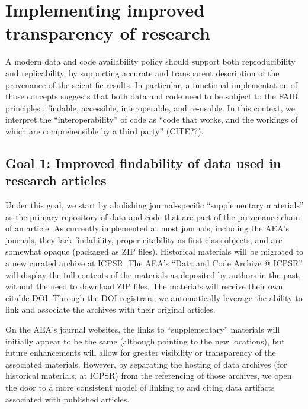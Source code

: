 \documentclass[AEJ]{AEA}
\begin{document}
\section{Implementing improved transparency of research}
A modern data and code availability policy should support both reproducibility and replicability, by supporting accurate and transparent description of the provenance of the scientific results. In particular, a functional implementation of those concepts suggests that both data and code need to be subject to the \ac{FAIR} principles \cite{FORCE11FAIRDATAPRINCIPLES}: findable, accessible, interoperable, and re-usable. In this context, we interpret the ``interoperability'' of code as ``code that works, and the workings of which are comprehensible by a third party'' (CITE??). 

\subsection{Goal 1: Improved findability of data used in research articles}

Under this goal, we start by abolishing journal-specific ``supplementary materials'' as the primary repository of data and code that are part of the provenance chain of an article. As currently implemented at most journals, including the \ac{AEA}'s journals, they lack findability, proper citability as first-class objects, and are somewhat opaque (packaged as ZIP files). Historical materials will be migrated to a new curated archive at ICPSR. The AEA's ``Data and Code Archive @ ICPSR'' will display the full contents of the materials as deposited by authors in the past, without the need to download ZIP files. The materials will receive their own citable \ac{DOI}. Through the \ac{DOI} registrars, we automatically leverage the ability to link and associate the archives with their original articles. 

On the AEA's journal websites, the links to ``supplementary'' materials will initially appear to be the same (although pointing to the new locations), but future enhancements will allow for greater visibility or transparency of the associated materials. However, by separating the hosting of data archives (for historical materials, at ICPSR) from the referencing of those archives, we open the door to a more consistent model of linking to and citing data artifacts associated with published articles.
\end{document}

